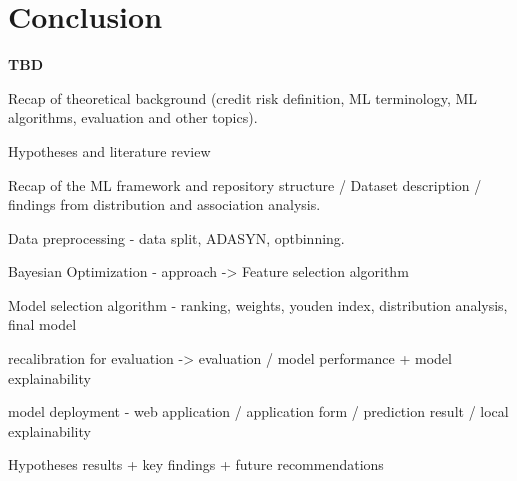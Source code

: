\chapter{Conclusion}
\label{conclusion}

\textbf{TBD}

Recap of theoretical background (credit risk definition, ML terminology, ML algorithms, evaluation and other topics).

Hypotheses and literature review

Recap of the ML framework and repository structure / Dataset description / findings from distribution and association analysis.

Data preprocessing - data split, ADASYN, optbinning.

Bayesian Optimization - approach -> Feature selection algorithm

Model selection algorithm - ranking, weights, youden index, distribution analysis, final model

recalibration for evaluation -> evaluation / model performance + model explainability

model deployment - web application / application form / prediction result / local explainability

Hypotheses results + key findings + future recommendations
